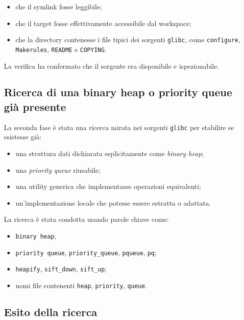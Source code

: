 \documentclass[a4paper,12pt]{article}
\begin{document}
\begin{itemize}[leftmargin=*]
    \item che il symlink fosse leggibile;
    \item che il target fosse effettivamente accessibile dal workspace;
    \item che la directory contenesse i file tipici dei sorgenti \texttt{glibc}, come \texttt{configure}, \texttt{Makerules}, \texttt{README} e \texttt{COPYING}.
\end{itemize}

La verifica ha confermato che il sorgente era disponibile e ispezionabile.

\subsection{Ricerca di una binary heap o priority queue già presente}

La seconda fase è stata una ricerca mirata nei sorgenti \texttt{glibc} per stabilire se esistesse già:

\begin{itemize}[leftmargin=*]
    \item una struttura dati dichiarata esplicitamente come \emph{binary heap};
    \item una \emph{priority queue} riusabile;
    \item una utility generica che implementasse operazioni equivalenti;
    \item un'implementazione locale che potesse essere estratta o adattata.
\end{itemize}

La ricerca è stata condotta usando parole chiave come:

\begin{itemize}[leftmargin=*]
    \item \texttt{binary heap};
    \item \texttt{priority queue}, \texttt{priority\_queue}, \texttt{pqueue}, \texttt{pq};
    \item \texttt{heapify}, \texttt{sift\_down}, \texttt{sift\_up};
    \item nomi file contenenti \texttt{heap}, \texttt{priority}, \texttt{queue}.
\end{itemize}

\subsection{Esito della ricerca}
\end{document}

